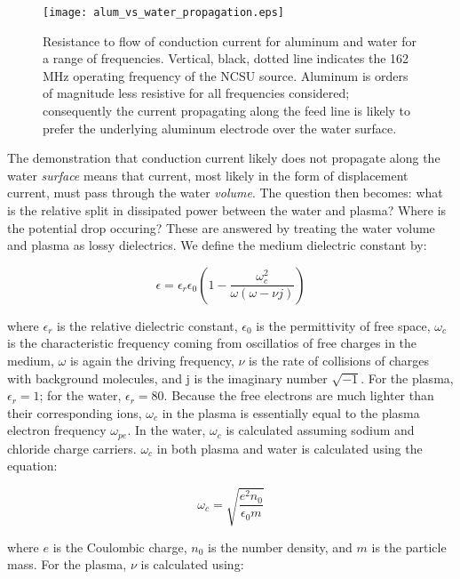 \begin{figure}[htbp]
  \centering
  \texttt{[image: alum\_vs\_water\_propagation.eps]}
  \caption{Resistance to flow of conduction current for aluminum and water for a range of frequencies. Vertical, black, dotted line indicates the 162 MHz operating frequency of the NCSU source. Aluminum is orders of magnitude less resistive for all frequencies considered; consequently the current propagating along the feed line is likely to prefer the underlying aluminum electrode over the water surface.}
   \label{fig:surf_propag}
\end{figure}

The demonstration that conduction current likely does not propagate along the water \textit{surface} means that current, most likely in the form of displacement current, must pass through the water \textit{volume}. The question then becomes: what is the relative split in dissipated power between the water and plasma? Where is the potential drop occuring? These are answered by treating the water volume and plasma as lossy dielectrics. We define the medium dielectric constant by:

\begin{equation}
  \epsilon = \epsilon_r\epsilon_0\left(1 - \frac{\omega_c^2}{\omega\left(\omega - \nu j\right)}\right)
  \label{eq:epsilon}
\end{equation}

where $\epsilon_r$ is the relative dielectric constant, $\epsilon_0$ is the permittivity of free space, $\omega_c$ is the characteristic frequency coming from oscillatios of free charges in the medium, $\omega$ is again the driving frequency, $\nu$ is the rate of collisions of charges with background molecules, and j is the imaginary number $\sqrt{-1}$. For the plasma, $\epsilon_r=1$; for the water, $\epsilon_r=80$. Because the free electrons are much lighter than their corresponding ions, $\omega_c$ in the plasma is essentially equal to the plasma electron frequency $\omega_{pe}$. In the water, $\omega_c$ is calculated assuming sodium and chloride charge carriers. $\omega_c$ in both plasma and water is calculated using the equation:

\begin{equation}
  \omega_c = \sqrt{\frac{e^2n_0}{\epsilon_0 m}}
  \label{eq:omega_c}
\end{equation}

where $e$ is the Coulombic charge, $n_0$ is the number density, and $m$ is the particle mass. For the plasma, $\nu$ is calculated using:

